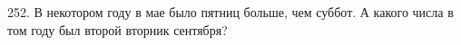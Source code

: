 252. В некотором году в мае было пятниц больше, чем суббот. А какого числа в том году был второй вторник сентября?\\
